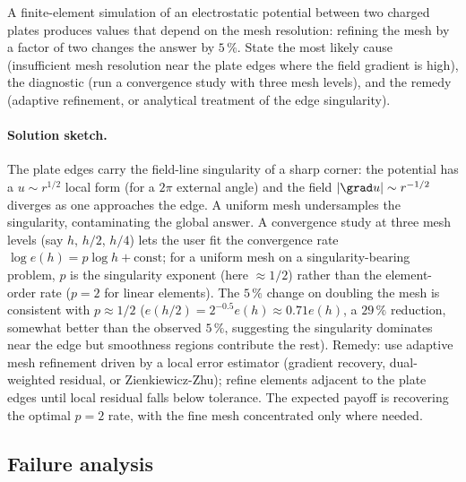 \begin{exercise}
A finite-element simulation of an electrostatic potential
between two charged plates produces values that depend on the
mesh resolution: refining the mesh by a factor of two changes
the answer by $5\,\%$. State the most likely cause (insufficient
mesh resolution near the plate edges where the field gradient
is high), the diagnostic (run a convergence study with three
mesh levels), and the remedy (adaptive refinement, or analytical
treatment of the edge singularity).

\paragraph{Solution sketch.}
The plate edges carry the field-line singularity of a sharp
corner: the potential has a $u \sim r^{1/2}$ local form (for a
$2\pi$ external angle) and the field $|\grad u| \sim r^{-1/2}$
diverges as one approaches the edge. A uniform mesh undersamples
the singularity, contaminating the global answer. A convergence
study at three mesh levels (say $h$, $h/2$, $h/4$) lets the user
fit the convergence rate $\log e(h) = p \log h + \text{const}$;
for a uniform mesh on a singularity-bearing problem, $p$ is the
singularity exponent (here $\approx 1/2$) rather than the
element-order rate ($p = 2$ for linear elements). The $5\,\%$
change on doubling the mesh is consistent with $p \approx 1/2$
($e(h/2) = 2^{-0.5} e(h) \approx 0.71 e(h)$, a $29\,\%$
reduction, somewhat better than the observed $5\,\%$, suggesting
the singularity dominates near the edge but smoothness regions
contribute the rest). Remedy: use adaptive mesh refinement
driven by a local error estimator (gradient recovery, dual-weighted
residual, or Zienkiewicz-Zhu); refine elements adjacent to the
plate edges until local residual falls below tolerance. The
expected payoff is recovering the optimal $p = 2$ rate, with
the fine mesh concentrated only where needed.
\end{exercise}

\subsection*{Failure analysis}

